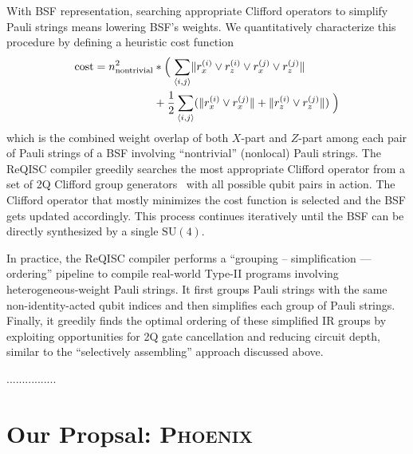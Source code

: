 \documentclass[conference]{IEEEtran}
\newcommand{\dquote}[1]{``#1''}
\newcommand{\NOTE}[1]{{\color{green} #1}}
\newcommand{\phoenix}{\textsc{Phoenix}}
\newcommand{\SUfour}{\mathrm{SU}(4)}
\begin{document}
{    With BSF representation, searching appropriate Clifford operators to simplify Pauli strings means lowering BSF's weights. We quantitatively characterize this procedure by defining a heuristic cost function
    \begin{align}
        \textrm{cost} =  n_\textrm{nontrivial}^2 &* \left(\vphantom{\sum}\right. \sum_{\langle i,j \rangle} \lVert r_x^{(i)} \lor r_z^{(i)} \lor r_x^{(j)} \lor r_z^{(j)} \rVert  \notag\\
        & + \frac{1}{2} \sum_{\langle i,j \rangle} (\lVert r_x^{(i)} \lor r_x^{(j)} \rVert + \lVert r_z^{(i)} \lor r_z^{(j)} \rVert)\left.\vphantom{\sum}\right)
    \end{align}
    which is the combined weight overlap of both $X$-part and $Z$-part among each pair of Pauli strings of a BSF involving \dquote{nontrivial} (nonlocal) Pauli strings. The ReQISC compiler greedily searches the most appropriate Clifford operator from a set of 2Q Clifford group generators~\cite{grier2022classification} with all possible qubit pairs in action. The Clifford operator that mostly minimizes the cost function is selected and the BSF gets updated accordingly. This process continues iteratively until the BSF can be directly synthesized by a single $\SUfour$.


    In practice, the ReQISC compiler performs a \dquote{grouping -- simplification --- ordering} pipeline to compile real-world Type-II programs involving heterogeneous-weight Pauli strings. It first groups Pauli strings with the same non-identity-acted qubit indices and then simplifies each group of Pauli strings. Finally, it greedily finds the optimal ordering of these simplified IR groups by exploiting opportunities for 2Q gate cancellation and reducing circuit depth, similar to the \dquote{selectively assembling} approach discussed above.

}


\NOTE{


    ................

}









\section{Our Propsal: \phoenix}
\end{document}
